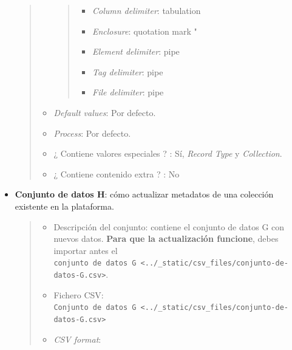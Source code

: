 \documentclass[
]{article}
\providecommand{\tightlist}{%
  \setlength{\itemsep}{0pt}\setlength{\parskip}{0pt}}
\begin{document}
\begin{itemize}
\begin{quote}
\begin{itemize}
    \begin{quote}
    \begin{itemize}
    \tightlist
    \item
      \emph{Column delimiter}: tabulation
    \item
      \emph{Enclosure}: quotation mark "
    \item
      \emph{Element delimiter}: pipe
    \item
      \emph{Tag delimiter}: pipe
    \item
      \emph{File delimiter}: pipe
    \end{itemize}
    \end{quote}
  \item
    \emph{Default values}: Por defecto.
  \item
    \emph{Process}: Por defecto.
  \item
    ¿ Contiene valores especiales ? : Sí, \emph{Record Type} y
    \emph{Collection}.
  \item
    ¿ Contiene contenido extra ? : No
  \end{itemize}
  \end{quote}
\item
  \textbf{Conjunto de datos H}: cómo actualizar metadatos de una
  colección existente en la plataforma.

  \begin{quote}
  \begin{itemize}
  \item
    Descripción del conjunto: contiene el conjunto de datos G con nuevos
    datos. \textbf{Para que la actualización funcione}, debes importar
    antes el
    \texttt{conjunto\ de\ datos\ G\ \textless{}../\_static/csv\_files/conjunto-de-datos-G.csv\textgreater{}}.
  \item
    Fichero CSV:
    \texttt{Conjunto\ de\ datos\ G\ \textless{}../\_static/csv\_files/conjunto-de-datos-G.csv\textgreater{}}
  \item
    \emph{CSV format}:


\end{itemize}
\end{quote}
\end{itemize}
\end{document}
